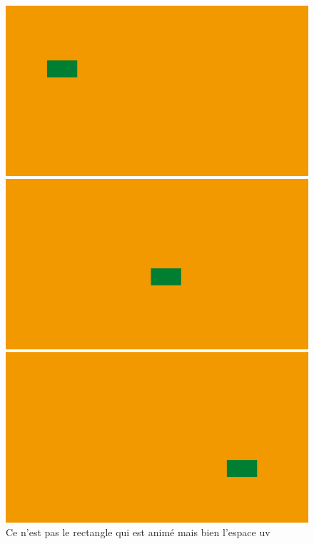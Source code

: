 \begin{figure}[h]
  \begin{minipage}[b]{0.30\linewidth}
    \centering
    \includegraphics[width=\linewidth]{images/shaders/animcarre00.PNG}
  \end{minipage}
  \hfill
  \begin{minipage}[b]{0.30\linewidth}
    \centering
    \includegraphics[width=\linewidth]{images/shaders/animcarre01.PNG}
  \end{minipage}
  \hfill
  \begin{minipage}[b]{0.30\linewidth}
    \centering
    \includegraphics[width=\linewidth]{images/shaders/animcarre02.PNG}
  \end{minipage}
  \caption{Ce n'est pas le rectangle qui est animé mais bien l'espace uv}
  \label{animcarre}
\end{figure}


